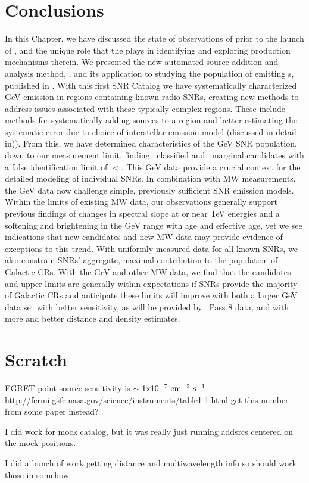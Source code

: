 \section{Conclusions}\label{snrcat:Conclusions}
In this Chapter, we have discussed the state of \gam{} observations of \snrs{} prior to the launch of \Fermi{}, and the unique role that the \lat{} plays in identifying \snrs{} and exploring \gam{} production mechanisms therein. We presented the new automated source addition and analysis method, \srcs{}, and its application to studying the population of \snrs{} emitting\gev{} \gam{}s, published in \cite{snrCat}. With this first \FermiLat{} SNR Catalog we have systematically characterized GeV emission in regions containing known radio SNRs, creating new methods to address issues associated with these typically complex regions. These include methods for systematically adding sources to a region and better estimating the systematic error due to choice of interstellar emission model (discussed in detail in)\cite{snrCat}). From this, we have determined characteristics of the GeV SNR population, down to our measurement limit, finding \nclassifiedsnrs~classified and \nmarginal~marginal candidates with a false identification limit of $<$\nninetyfivemockpercent  \citep{snrCat}. This GeV data provide a crucial context for the detailed modeling of individual SNRs. In combination with MW measurements, the GeV data now challenge simple, previously sufficient SNR emission models. Within the limits of existing MW data, our observations generally support previous findings of changes in spectral slope at or near TeV energies and a softening and brightening in the GeV range with age and effective age, yet we see indications that new candidates and new MW data may provide evidence of exceptions to this trend. With uniformly measured data for all known SNRs, we also constrain SNRs' aggregate, maximal contribution to the population of Galactic CRs. With the GeV and other MW data, we find that the candidates and upper limits are generally within expectations if SNRs provide the majority of Galactic CRs and anticipate these limits will improve with both a larger GeV data set with better sensitivity, as will be provided by \FermiLat~Pass 8 data, and with more and better distance and density estimates.

\section{Scratch}

EGRET point source sensitivity is ${\rm \sim1x10^{-7}}~\mathrm{cm^{-2}~s^{-1}}{}$
\url{http://fermi.gsfc.nasa.gov/science/instruments/table1-1.html} get this number from some paper instead?


I did work for mock catalog, but it was really just running addsrcs centered on the mock positions. 

I did a bunch of work getting distance and multiwavelength info so should work those in somehow